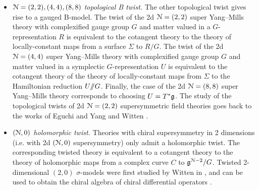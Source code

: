 \documentclass[10pt, oneside]{article}
\begin{document}
\begin{itemize}
 \item \emph{$\mathcal{N}=(2,2), (4,4), (8,8)$ topological B twist.} The other topological twist gives rise to a gauged B-model. The twist of the 2d $\mathcal N=(2, 2)$ super Yang--Mills theory with complexified gauge group $G$ and matter valued in a $G$-representation $R$ is equivalent to the cotangent theory to the theory of locally-constant maps from a surface $\Sigma$ to $R/G$. The twist of the 2d $\mathcal N=(4, 4)$ super Yang--Mills theory with complexified gauge group $G$ and matter valued in a symplectic $G$-representation $U$ is equivalent to the cotangent theory of the theory of locally-constant maps from $\Sigma$ to the Hamiltonian reduction $U/\!\!/ G$. Finally, the case of the 2d $\mathcal N=(8, 8)$ super Yang--Mills theory corresponds to choosing $U=T^*\mathfrak g$. The study of the topological twists of 2d $\mathcal{N}=(2,2)$ supersymmetric field theories goes back to the works of Eguchi and Yang \cite{EguchiYang} and Witten \cite{Wittenmirror}.
 \item \emph{$(\mathcal N, 0)$ holomorphic twist.} Theories with chiral supersymmetry in 2 dimensions (i.e. with 2d $(\mathcal N, 0)$ supersymmetry) only admit a holomorphic twist. The corresponding twisted theory is equivalent to a cotangent theory to the theory of holomorphic maps from a complex curve $C$ to $\mathfrak g^{\mathcal N-2} / G$. Twisted 2-dimensional $(2,0)$ $\sigma$-models were first studied by Witten in \cite{Wittenmirror}, and can be used to obtain the chiral algebra of chiral differential operators \cite{WittenCDO}. 
\end{itemize}
\end{document}
